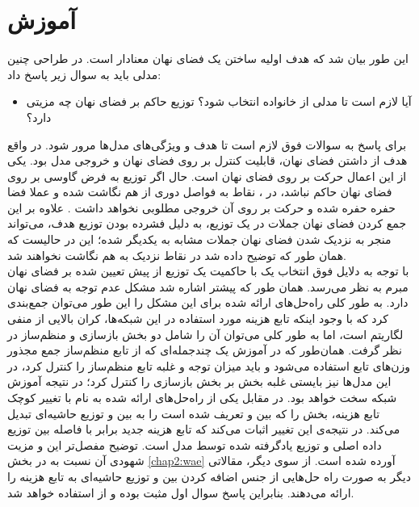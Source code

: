 \section{آموزش \autoencoder{}} \label{chap3:wae_training}
این طور بیان شد که هدف اولیه ساختن یک فضای نهان معنادار است. در طراحی چنین مدلی باید به سوال زیر پاسخ داد:
\begin{itemize}
	\item
	      آیا لازم است تا مدلی از خانواده \vae{}  انتخاب شود؟ توزیع حاکم بر فضای نهان چه مزیتی دارد؟
\end{itemize}
برای پاسخ به سوالات فوق لازم است تا هدف و ویژگی‌های مدل‌ها مرور شود. در واقع هدف از داشتن فضای نهان، قابلیت کنترل بر روی فضای نهان و خروجی مدل بود. یکی از این اعمال حرکت بر روی فضای نهان است. حال اگر توزیع به فرض گاوسی بر روی فضای نهان حاکم نباشد، در \autoencoder{}، نقاط به فواصل دوری از هم نگاشت شده و عملا فضا حفره حفره شده و حرکت بر روی آن خروجی مطلوبی نخواهد داشت \cite{infovae}. علاوه بر این جمع کردن فضای نهان جملات در یک توزیع، به دلیل فشرده بودن توزیع هدف، می‌تواند منجر به نزدیک شدن فضای نهان جملات مشابه به یکدیگر شده؛ این در حالیست که همان طور که توضیح داده شد در   \autoencoder{} نقاط نزدیک به هم نگاشت نخواهند شد.
\\
با توجه به دلایل فوق انتخاب یک \autoencoder{} با حاکمیت یک توزیع از پیش تعیین شده بر فضای نهان مبرم به نظر می‌رسد. همان طور که پیشتر اشاره شد \vae{} مشکل عدم توجه به فضای نهان دارد. به طور کلی راه‌حل‌های ارائه شده برای این مشکل را این طور  می‌توان جمع‌بندی کرد که با وجود اینکه تابع هزینه مورد استفاده در این شبکه‌ها، کران بالایی از منفی لگاریتم \likelihood است، اما به طور کلی می‌توان آن را شامل دو بخش بازسازی و منظم‌ساز در نظر گرفت. همان‌طور که در آموزش یک چندجمله‌ای که از تابع منظم‌ساز جمع مجذور وزن‌های تابع استفاده می‌شود و باید میزان توجه و غلبه تابع منظم‌ساز را کنترل کرد، در این مدل‌ها نیز بایستی غلبه بخش  بر بخش بازسازی را کنترل کرد؛ در نتیجه آموزش شبکه سخت خواهد بود. در مقابل یکی از راه‌حل‌های ارائه شده به نام \wae{} با تغییر کوچک تابع هزینه، بخش  را که بین \priordist{} و \posteriordist{} تعریف شده است را به  بین \priordist{} و توزیع حاشیه‌ای \posterior{} تبدیل می‌کند. در نتیجه‌ی این تغییر اثبات می‌کند که تابع هزینه جدید برابر با فاصله \wasser{} بین توزیع داده اصلی و توزیع یادگرفته شده توسط مدل است. توضیح مفصل‌تر این \autoencoder{} و مزیت شهودی آن نسبت به \vae{} در بخش \ref{chap2:wae} آورده شده است.
از سوی دیگر، مقالاتی دیگر به صورت \huristic{} راه حل‌هایی از جنس اضافه کردن  بین \priordist{} و توزیع حاشیه‌ای \posterior{} به تابع هزینه \vae{} را ارائه می‌دهند.  بنابراین پاسخ سوال اول مثبت بوده و از \wae{} استفاده خواهد شد.
